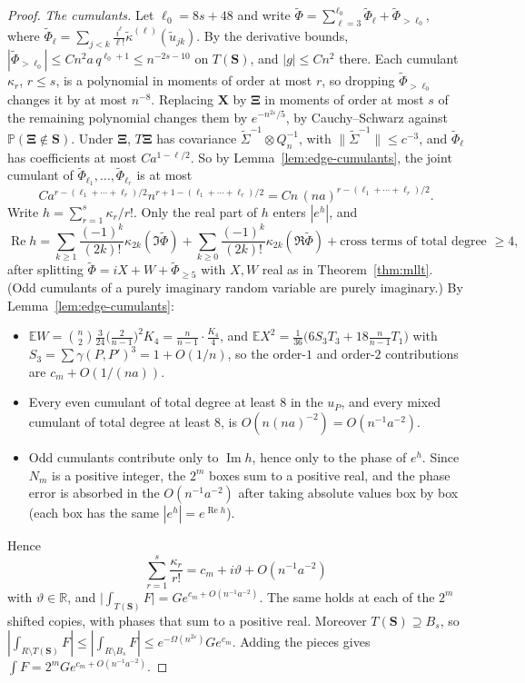 \documentclass[11pt]{article}
\newcommand{\EE}{\mathbb{E}}
\newcommand{\PP}{\mathbb{P}}
\begin{document}
\begin{proof}
\emph{The cumulants.}
Let \(\ell_0=8s+48\) and write \(\tilde\Phi=\sum_{\ell=3}^{\ell_0}\tilde\Phi_\ell+\tilde\Phi_{>\ell_0}\),
where \(\tilde\Phi_\ell=\sum_{j<k}\frac{i^\ell}{\ell!}\tilde\kappa^{(\ell)}(\tilde u_{jk})\).
By the derivative bounds,
\(|\tilde\Phi_{>\ell_0}|\le Cn^2a\,q^{\ell_0+1}\le n^{-2s-10}\) on \(T(\boldsymbol S)\), and
\(|g|\le Cn^2\) there. Each cumulant \(\kappa_r\), \(r\le s\), is a polynomial in
moments of order at most \(r\), so dropping \(\tilde\Phi_{>\ell_0}\) changes it by at
most \(n^{-8}\). Replacing \(\boldsymbol X\) by \(\boldsymbol\Xi\) in moments of order at
most \(s\) of the remaining polynomial changes them by \(e^{-n^{2\varepsilon}/5}\), by
Cauchy--Schwarz against \(\PP(\boldsymbol\Xi\notin\boldsymbol S)\).
Under \(\boldsymbol\Xi\), \(T\boldsymbol\Xi\) has covariance
\(\tilde\Sigma^{-1}\otimes Q_n^{-1}\), with \(\|\tilde\Sigma^{-1}\|\le c^{-3}\), and
\(\tilde\Phi_\ell\) has coefficients at most \(Ca^{1-\ell/2}\). So by
Lemma~\ref{lem:edge-cumulants}, the joint cumulant of
\(\tilde\Phi_{\ell_1},\ldots,\tilde\Phi_{\ell_r}\) is at most
\[
Ca^{r-(\ell_1+\cdots+\ell_r)/2}n^{r+1-(\ell_1+\cdots+\ell_r)/2}
=Cn\,(na)^{r-(\ell_1+\cdots+\ell_r)/2}.
\]
Write \(h=\sum_{r=1}^s\kappa_r/r!\). Only the real part of \(h\) enters
\(|e^h|\), and
\[
\operatorname{Re}h
=\sum_{k\ge1}\frac{(-1)^k}{(2k)!}\kappa_{2k}(\Im\tilde\Phi)
+\sum_{k\ge0}\frac{(-1)^k}{(2k)!}\kappa_{2k}(\Re\tilde\Phi)
+\text{cross terms of total degree \(\ge4\)},
\]
after splitting \(\tilde\Phi=iX+W+\tilde\Phi_{\ge5}\) with \(X,W\) real as in
Theorem~\ref{thm:mllt}. (Odd cumulants of a purely imaginary random variable
are purely imaginary.) By Lemma~\ref{lem:edge-cumulants}:
\begin{itemize}
\item \(\EE W=\binom n2\frac3{24}\bigl(\frac2{n-1}\bigr)^2K_4=\frac n{n-1}\cdot\frac{K_4}4\),
and \(\EE X^2=\frac1{36}\bigl(6S_3T_3+18\frac n{n-1}T_1\bigr)\) with
\(S_3=\sum\gamma(P,P')^3=1+O(1/n)\), so the order-\(1\) and order-\(2\)
contributions are \(c_m+O(1/(na))\).
\item Every even cumulant of total degree at least \(8\) in the \(u_P\), and every
mixed cumulant of total degree at least \(8\), is
\(O(n(na)^{-2})=O(n^{-1}a^{-2})\).
\item Odd cumulants contribute only to \(\operatorname{Im}h\), hence only to the
phase of \(e^h\). Since \(N_m\) is a positive integer, the \(2^m\) boxes sum to a
positive real, and the phase error is absorbed in the \(O(n^{-1}a^{-2})\) after
taking absolute values box by box (each box has the same
\(|e^h|=e^{\operatorname{Re}h}\)).
\end{itemize}
Hence
\[
\sum_{r=1}^s\frac{\kappa_r}{r!}=c_m+i\vartheta+O(n^{-1}a^{-2})
\]
with \(\vartheta\in\mathbb R\), and
\(\bigl|\int_{T(\boldsymbol S)}F\bigr|=Ge^{c_m+O(n^{-1}a^{-2})}\).
The same holds at each of the \(2^m\) shifted copies, with phases that sum to a
positive real.
Moreover \(T(\boldsymbol S)\supseteq B_s\), so
\(|\int_{R\setminus T(\boldsymbol S)}F|\le|\int_{R\setminus B_s}F|
\le e^{-\Omega(n^{2\varepsilon})}Ge^{c_m}\).
Adding the pieces gives \(\int F=2^mGe^{c_m+O(n^{-1}a^{-2})}\).
\end{proof}
\end{document}
